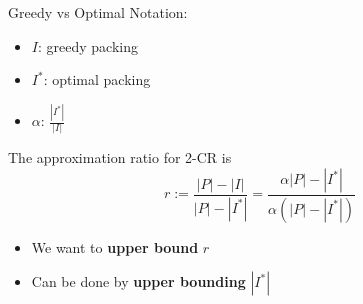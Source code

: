 \begin{frame}{Greedy vs Optimal}
Notation:
\begin{itemize}
\pause\item
\alert{$I$}: greedy packing

\pause\item
\alert{$I^*$}: optimal packing

\pause\item
\alert{$\alpha$}: $\frac{|I^*|}{|I|}$ 

\end{itemize}

\pause
\begin{observation}
The approximation ratio for 2-CR is
$$ r := 
\frac{|P| - |I|}{|P| - |I^*|} = 
\frac{\alpha |P| - |I^*|}{\alpha (|P| - |I^*|)}
$$
\end{observation}

\begin{itemize}
\pause\item
We want to \textbf{upper bound} $r$
\pause\item
Can be done by \textbf{upper bounding} $|I^*|$
\end{itemize}


\end{frame}